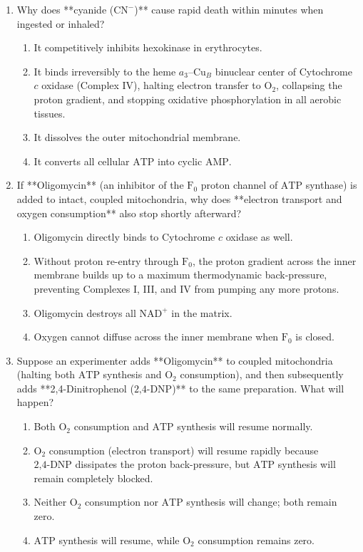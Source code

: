 \documentclass[11pt, a4paper]{article}
\begin{document}
\begin{enumerate}[label=\textbf{\arabic*.}]
\item Why does **cyanide ($\text{CN}^-$)** cause rapid death within minutes when ingested or inhaled?
\begin{enumerate}[label=(\Alph*)]
    \item It competitively inhibits hexokinase in erythrocytes.
    \item It binds irreversibly to the heme $a_3\text{--Cu}_B$ binuclear center of Cytochrome $c$ oxidase (Complex IV), halting electron transfer to $\text{O}_2$, collapsing the proton gradient, and stopping oxidative phosphorylation in all aerobic tissues.
    \item It dissolves the outer mitochondrial membrane.
    \item It converts all cellular $\text{ATP}$ into cyclic $\text{AMP}$.
\end{enumerate}

\item If **Oligomycin** (an inhibitor of the $\text{F}_0$ proton channel of $\text{ATP}$ synthase) is added to intact, coupled mitochondria, why does **electron transport and oxygen consumption** also stop shortly afterward?
\begin{enumerate}[label=(\Alph*)]
    \item Oligomycin directly binds to Cytochrome $c$ oxidase as well.
    \item Without proton re-entry through $\text{F}_0$, the proton gradient across the inner membrane builds up to a maximum thermodynamic back-pressure, preventing Complexes I, III, and IV from pumping any more protons.
    \item Oligomycin destroys all $\text{NAD}^+$ in the matrix.
    \item Oxygen cannot diffuse across the inner membrane when $\text{F}_0$ is closed.
\end{enumerate}

\item Suppose an experimenter adds **Oligomycin** to coupled mitochondria (halting both $\text{ATP}$ synthesis and $\text{O}_2$ consumption), and then subsequently adds **2,4-Dinitrophenol ($\text{2,4-DNP}$)** to the same preparation. What will happen?
\begin{enumerate}[label=(\Alph*)]
    \item Both $\text{O}_2$ consumption and $\text{ATP}$ synthesis will resume normally.
    \item $\text{O}_2$ consumption (electron transport) will resume rapidly because $\text{2,4-DNP}$ dissipates the proton back-pressure, but $\text{ATP}$ synthesis will remain completely blocked.
    \item Neither $\text{O}_2$ consumption nor $\text{ATP}$ synthesis will change; both remain zero.
    \item $\text{ATP}$ synthesis will resume, while $\text{O}_2$ consumption remains zero.
\end{enumerate}


\end{enumerate}
\end{document}

